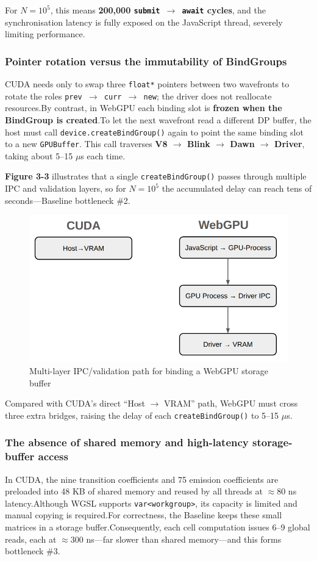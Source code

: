 \documentclass[PhD]{PHlab-thesis}
\begin{document}
For $N=10^5$, this means \textbf{200,000 \texttt{submit $\rightarrow$ await} cycles}, and the synchronisation latency is fully exposed on the JavaScript thread, severely limiting performance.

\subsubsection{Pointer rotation versus the immutability of BindGroups}
CUDA needs only to swap three \texttt{float*} pointers between two wavefronts to rotate the roles \texttt{prev $\rightarrow$ curr $\rightarrow$ new}; the driver does not reallocate resources.By contrast, in WebGPU each binding slot is \textbf{frozen when the BindGroup is created}.To let the next wavefront read a different DP buffer, the host must call \texttt{device.createBindGroup()} again to point the same binding slot to a new \texttt{GPUBuffer}.
This call traverses \textbf{V8 $\rightarrow$ Blink $\rightarrow$ Dawn $\rightarrow$ Driver}, taking about 5–15 $\mu$s each time.

\textbf{Figure 3-3} illustrates that a single \texttt{createBindGroup()} passes through multiple IPC and validation layers, so for $N=10^5$ the accumulated delay can reach tens of seconds—Baseline bottleneck \#2.

\begin{figure}[htbp]
    \centering
    \includegraphics[width=0.7\linewidth]{3. WebGPU 多層 IPC／驗證路徑.png}
    \caption{Multi-layer IPC/validation path for binding a WebGPU storage buffer}
    \label{fig:webgpu-ipc-validation}
\end{figure}


Compared with CUDA’s direct ``Host $\rightarrow$ VRAM'' path, WebGPU must cross three extra bridges, raising the delay of each \texttt{createBindGroup()} to 5–15 $\mu$s.

\subsubsection{The absence of shared memory and high-latency storage-buffer access}
In CUDA, the nine transition coefficients and 75 emission coefficients are preloaded into 48 KB of shared memory and reused by all threads at $\approx$80 ns latency.Although WGSL supports \texttt{var<workgroup>}, its capacity is limited and manual copying is required.For correctness, the Baseline keeps these small matrices in a storage buffer.Consequently, each cell computation issues 6–9 global reads, each at $\approx$300 ns—far slower than shared memory—and this forms bottleneck \#3.
\end{document}
